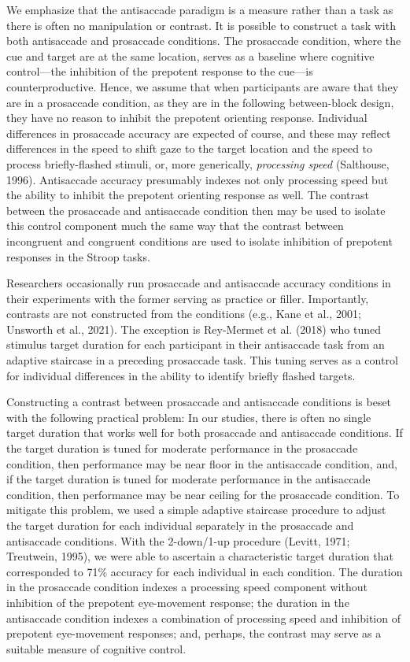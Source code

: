 \documentclass[
  ,man,floatsintext]{apa6}
\begin{document}
We emphasize that the antisaccade paradigm is a measure rather than a task as there is often no manipulation or contrast. It is possible to construct a task with both antisaccade and prosaccade conditions. The prosaccade condition, where the cue and target are at the same location, serves as a baseline where cognitive control---the inhibition of the prepotent response to the cue---is counterproductive. Hence, we assume that when participants are aware that they are in a prosaccade condition, as they are in the following between-block design, they have no reason to inhibit the prepotent orienting response. Individual differences in prosaccade accuracy are expected of course, and these may reflect differences in the speed to shift gaze to the target location and the speed to process briefly-flashed stimuli, or, more generically, \emph{processing speed} (Salthouse, 1996). Antisaccade accuracy presumably indexes not only processing speed but the ability to inhibit the prepotent orienting response as well. The contrast between the prosaccade and antisaccade condition then may be used to isolate this control component much the same way that the contrast between incongruent and congruent conditions are used to isolate inhibition of prepotent responses in the Stroop tasks.

Researchers occasionally run prosaccade and antisaccade accuracy conditions in their experiments with the former serving as practice or filler. Importantly, contrasts are not constructed from the conditions (e.g., Kane et al., 2001; Unsworth et al., 2021). The exception is Rey-Mermet et al. (2018) who tuned stimulus target duration for each participant in their antisaccade task from an adaptive staircase in a preceding prosaccade task. This tuning serves as a control for individual differences in the ability to identify briefly flashed targets.

Constructing a contrast between prosaccade and antisaccade conditions is beset with the following practical problem: In our studies, there is often no single target duration that works well for both prosaccade and antisaccade conditions. If the target duration is tuned for moderate performance in the prosaccade condition, then performance may be near floor in the antisaccade condition, and, if the target duration is tuned for moderate performance in the antisaccade condition, then performance may be near ceiling for the prosaccade condition. To mitigate this problem, we used a simple adaptive staircase procedure to adjust the target duration for each individual separately in the prosaccade and antisaccade conditions. With the 2-down/1-up procedure (Levitt, 1971; Treutwein, 1995), we were able to ascertain a characteristic target duration that corresponded to 71\% accuracy for each individual in each condition. The duration in the prosaccade condition indexes a processing speed component without inhibition of the prepotent eye-movement response; the duration in the antisaccade condition indexes a combination of processing speed and inhibition of prepotent eye-movement responses; and, perhaps, the contrast may serve as a suitable measure of cognitive control.
\end{document}
